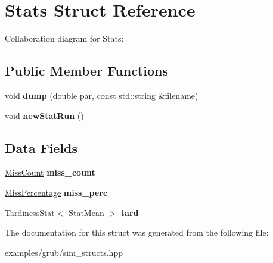 \hypertarget{structStats}{}\section{Stats Struct Reference}
\label{structStats}


Collaboration diagram for Stats\+:
\subsection*{Public Member Functions}
\begin{DoxyCompactItemize}
\item 
void {\bfseries dump} (double par, const std\+::string \&filename)\hypertarget{structStats_a8f2f8cb92e40e57fd71b0f4dcc7d52a8}{}\label{structStats_a8f2f8cb92e40e57fd71b0f4dcc7d52a8}

\item 
void {\bfseries new\+Stat\+Run} ()\hypertarget{structStats_a5b1cdc9f745c9af71a9ee76221c2249c}{}\label{structStats_a5b1cdc9f745c9af71a9ee76221c2249c}

\end{DoxyCompactItemize}
\subsection*{Data Fields}
\begin{DoxyCompactItemize}
\item 
\hyperlink{classRTSim_1_1MissCount}{Miss\+Count} {\bfseries miss\+\_\+count}\hypertarget{structStats_a97d41d00fc7f2a577e0cad77184a29e1}{}\label{structStats_a97d41d00fc7f2a577e0cad77184a29e1}

\item 
\hyperlink{classRTSim_1_1MissPercentage}{Miss\+Percentage} {\bfseries miss\+\_\+perc}\hypertarget{structStats_ac239d9cd187fb51302f04b7903b06b5f}{}\label{structStats_ac239d9cd187fb51302f04b7903b06b5f}

\item 
\hyperlink{classRTSim_1_1TardinessStat}{Tardiness\+Stat}$<$ Stat\+Mean $>$ {\bfseries tard}\hypertarget{structStats_a4b0ceb112677528c0dc2b6b8e2b4be00}{}\label{structStats_a4b0ceb112677528c0dc2b6b8e2b4be00}

\end{DoxyCompactItemize}


The documentation for this struct was generated from the following file\+:\begin{DoxyCompactItemize}
\item 
examples/grub/sim\+\_\+structs.\+hpp\end{DoxyCompactItemize}
